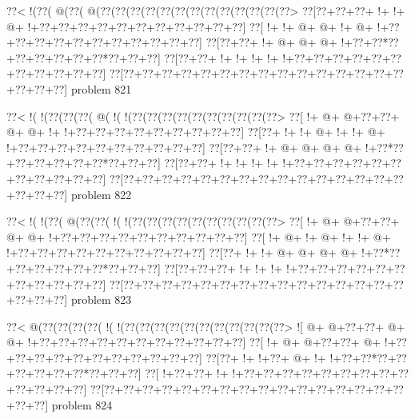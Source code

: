 \vbox{\vbox{\goo
\0??<\- !(\0??(\- @(\0??(\- @(\0??(\0??(\0??(\0??(\0??(\0??(\0??(\0??(\0??(\0??(\0??(\0??(\0??>
\0??[\0??+\0??+\0??+\- !+\- !+\- @+\- !+\0??+\0??+\0??+\0??+\0??+\0??+\0??+\0??+\0??+\0??+\0??]
\0??[\- !+\- !+\- @+\- @+\- !+\- @+\- !+\0??+\0??+\0??+\0??+\0??+\0??+\0??+\0??+\0??+\0??+\0??]
\0??[\0??+\0??+\- !+\- @+\- @+\- @+\- !+\0??+\0??*\0??+\0??+\0??+\0??+\0??+\0??*\0??+\0??+\0??]
\0??[\0??+\0??+\- !+\- !+\- !+\- !+\- !+\0??+\0??+\0??+\0??+\0??+\0??+\0??+\0??+\0??+\0??+\0??]
\0??[\0??+\0??+\0??+\0??+\0??+\0??+\0??+\0??+\0??+\0??+\0??+\0??+\0??+\0??+\0??+\0??+\0??+\0??]
}
\hfil problem 821\hfil\break
}



\vbox{\vbox{\goo
\0??<\- !(\- !(\0??(\0??(\0??(\- @(\- !(\- !(\0??(\0??(\0??(\0??(\0??(\0??(\0??(\0??(\0??(\0??>
\0??[\- !+\- @+\- @+\0??+\0??+\- @+\- @+\- !+\- !+\0??+\0??+\0??+\0??+\0??+\0??+\0??+\0??+\0??]
\0??[\0??+\- !+\- !+\- @+\- !+\- !+\- @+\- !+\0??+\0??+\0??+\0??+\0??+\0??+\0??+\0??+\0??+\0??]
\0??[\0??+\0??+\- !+\- @+\- @+\- @+\- @+\- !+\0??*\0??+\0??+\0??+\0??+\0??+\0??*\0??+\0??+\0??]
\0??[\0??+\0??+\- !+\- !+\- !+\- !+\- !+\0??+\0??+\0??+\0??+\0??+\0??+\0??+\0??+\0??+\0??+\0??]
\0??[\0??+\0??+\0??+\0??+\0??+\0??+\0??+\0??+\0??+\0??+\0??+\0??+\0??+\0??+\0??+\0??+\0??+\0??]
}
\hfil problem 822\hfil\break
}



\vbox{\vbox{\goo
\0??<\- !(\- !(\0??(\- @(\0??(\0??(\- !(\- !(\0??(\0??(\0??(\0??(\0??(\0??(\0??(\0??(\0??(\0??>
\0??[\- !+\- @+\- @+\0??+\0??+\- @+\- @+\- !+\0??+\0??+\0??+\0??+\0??+\0??+\0??+\0??+\0??+\0??]
\0??[\- !+\- @+\- !+\- @+\- !+\- !+\- @+\- !+\0??+\0??+\0??+\0??+\0??+\0??+\0??+\0??+\0??+\0??]
\0??[\0??+\- !+\- !+\- @+\- @+\- @+\- @+\- !+\0??*\0??+\0??+\0??+\0??+\0??+\0??*\0??+\0??+\0??]
\0??[\0??+\0??+\0??+\- !+\- !+\- !+\- !+\0??+\0??+\0??+\0??+\0??+\0??+\0??+\0??+\0??+\0??+\0??]
\0??[\0??+\0??+\0??+\0??+\0??+\0??+\0??+\0??+\0??+\0??+\0??+\0??+\0??+\0??+\0??+\0??+\0??+\0??]
}
\hfil problem 823\hfil\break
}



\vbox{\vbox{\goo
\0??<\- @(\0??(\0??(\0??(\0??(\- !(\- !(\0??(\0??(\0??(\0??(\0??(\0??(\0??(\0??(\0??(\0??(\0??>
\- ![\- @+\- @+\0??+\0??+\- @+\- @+\- !+\0??+\0??+\0??+\0??+\0??+\0??+\0??+\0??+\0??+\0??+\0??]
\0??[\- !+\- @+\- @+\0??+\0??+\- @+\- !+\0??+\0??+\0??+\0??+\0??+\0??+\0??+\0??+\0??+\0??+\0??]
\0??[\0??+\- !+\- !+\0??+\- @+\- !+\- !+\0??+\0??*\0??+\0??+\0??+\0??+\0??+\0??*\0??+\0??+\0??]
\0??[\- !+\0??+\0??+\- !+\- !+\0??+\0??+\0??+\0??+\0??+\0??+\0??+\0??+\0??+\0??+\0??+\0??+\0??]
\0??[\0??+\0??+\0??+\0??+\0??+\0??+\0??+\0??+\0??+\0??+\0??+\0??+\0??+\0??+\0??+\0??+\0??+\0??]
}
\hfil problem 824\hfil\break
}



